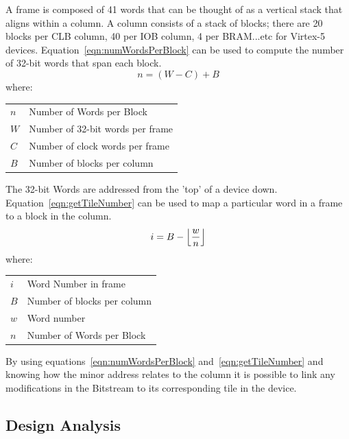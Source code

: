 \documentclass[conference]{IEEEtran}
\makeatletter
\newcommand{\ConditionSize}{\footnotesize}
\DeclarePairedDelimiter\floor{\lfloor}{\rfloor}
\newenvironment{conditions}
{\par\vspace{\abovedisplayskip}\noindent\begin{tabular}{>{$}l<{$} @{${}={}$} l}}
	{\end{tabular}\par\vspace{\belowdisplayskip}}
\makeatother
\begin{document}
A frame is composed of 41 words that can be thought of as a vertical stack that aligns within a column.
A column consists of a stack of blocks; there are 20 blocks per \acrshort{CLB} column, 40 per \acrshort{IOB} column, 4 per \acrshort{BRAM}...etc for Virtex-5 devices.
Equation~\ref{eqn:numWordsPerBlock} can be used to compute the number of 32-bit words that span each block.
\begin{equation} \label{eqn:numWordsPerBlock}
n = (W - C) + B
\end{equation}
\ConditionSize
where:
\begin{conditions}
	n     &  Number of Words per Block \\
	W     &  Number of 32-bit words per frame \\   
	C     &  Number of clock words per frame \\
	B     &  Number of blocks per column
\end{conditions}
\normalsize
The 32-bit Words are addressed from the 'top' of a device down.
Equation~\ref{eqn:getTileNumber} can be used to map a particular word in a frame to a block in the column.
\begin{equation} \label{eqn:getTileNumber}
i = B - \floor*{\frac{w}{n}}
\end{equation}
\ConditionSize
where:
\begin{conditions}
	i     &  Word Number in frame\\
	B     &  Number of blocks per column \\
	w     &  Word number \\
	n     &  Number of Words per Block 
\end{conditions}
\normalsize
By using equations~\ref{eqn:numWordsPerBlock} and~\ref{eqn:getTileNumber}  and knowing how the minor address relates to the column it is possible to link any modifications in the \gls{Bitstream} to its corresponding tile in the device.
\subsection{Design Analysis}
\end{document}
